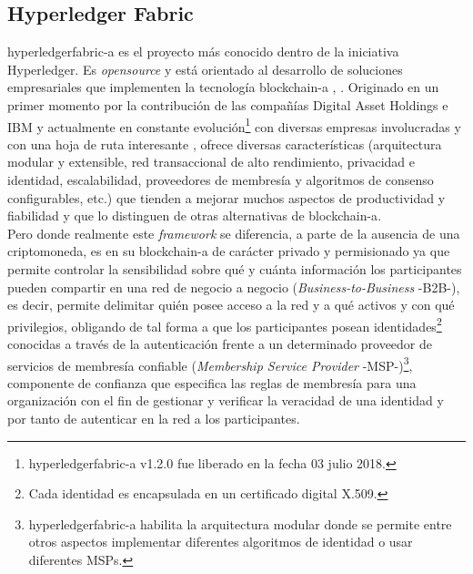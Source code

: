 \documentclass[12pt,a4paper, twoside]{report}
\begin{document}
	\subsection{Hyperledger Fabric}
	
	\gls{hyperledgerfabric-a} es el proyecto más conocido dentro de la iniciativa Hyperledger. Es \textit{\gls{opensource}} y está orientado al desarrollo de soluciones empresariales que implementen la tecnología \gls{blockchain-a} \cite{hyperledger:architecture:url}, \cite{hf:2018}. Originado en un primer momento por la contribución de las compañías Digital Asset Holdings e IBM y actualmente en constante evolución\footnote{\gls{hyperledgerfabric-a} v1.2.0 fue liberado en la fecha 03 julio 2018.} con diversas empresas involucradas y con una hoja de ruta interesante \cite{hyperledgerfabricroadmap:url}, ofrece diversas características (arquitectura modular y extensible, red transaccional de alto rendimiento, privacidad e identidad, escalabilidad, proveedores de membresía y algoritmos de consenso configurables, etc.) que tienden a mejorar muchos aspectos de productividad y fiabilidad y que lo distinguen de otras alternativas de \gls{blockchain-a}. \\

	Pero donde realmente este \textit{\gls{framework}} se diferencia, a parte de la ausencia de una criptomoneda, es en su \gls{blockchain-a} de carácter privado y permisionado ya que permite controlar la sensibilidad sobre qué y cuánta información los participantes pueden compartir en una red de negocio a negocio (\textit{Business-to-Business} -B2B-), es decir, permite delimitar quién posee acceso a la red y a qué activos y con qué privilegios, obligando de tal forma a que los participantes posean identidades\footnote{Cada identidad es encapsulada en un certificado digital X.509.} conocidas a través de la autenticación frente a un determinado proveedor de servicios de membresía confiable (\textit{Membership Service Provider} -MSP-)\footnote{\gls{hyperledgerfabric-a} habilita la arquitectura modular donde se permite entre otros aspectos implementar diferentes algoritmos de identidad o usar diferentes MSPs.}, componente de confianza que especifica las reglas de membresía para una organización con el fin de gestionar y verificar la veracidad de una identidad y por tanto de autenticar en la red a los participantes. \\
	
\end{document}
